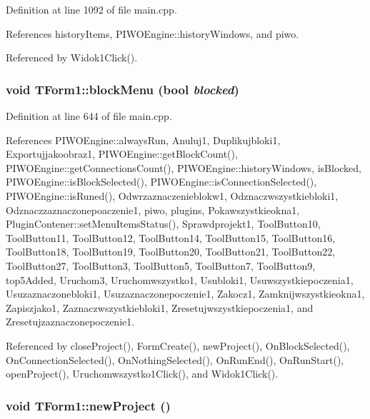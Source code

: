 Definition at line 1092 of file main.cpp.

References historyItems, PIWOEngine::historyWindows, and piwo.

Referenced by Widok1Click().\hypertarget{classTForm1_7e8d6ef0115bb7fcb6cb5f7c3bf23890}{
\subsubsection[blockMenu]{\setlength{\rightskip}{0pt plus 5cm}void TForm1::blockMenu (bool {\em blocked})}}
\label{classTForm1_7e8d6ef0115bb7fcb6cb5f7c3bf23890}




Definition at line 644 of file main.cpp.

References PIWOEngine::alwaysRun, Anuluj1, Duplikujbloki1, Exportujjakoobraz1, PIWOEngine::getBlockCount(), PIWOEngine::getConnectionsCount(), PIWOEngine::historyWindows, isBlocked, PIWOEngine::isBlockSelected(), PIWOEngine::isConnectionSelected(), PIWOEngine::isRuned(), Odwrzaznaczenieblokw1, Odznaczwszystkiebloki1, Odznaczzaznaczonepoaczenie1, piwo, plugins, Pokawszystkieokna1, PluginContener::setMenuItemsStatus(), Sprawdprojekt1, ToolButton10, ToolButton11, ToolButton12, ToolButton14, ToolButton15, ToolButton16, ToolButton18, ToolButton19, ToolButton20, ToolButton21, ToolButton22, ToolButton27, ToolButton3, ToolButton5, ToolButton7, ToolButton9, top5Added, Uruchom3, Uruchomwszystko1, Usubloki1, Usuwszystkiepoczenia1, Usuzaznaczonebloki1, Usuzaznaczonepoczenie1, Zakocz1, Zamknijwszystkieokna1, Zapiszjako1, Zaznaczwszystkiebloki1, Zresetujwszystkiepoczenia1, and Zresetujzaznaczonepoczenie1.

Referenced by closeProject(), FormCreate(), newProject(), OnBlockSelected(), OnConnectionSelected(), OnNothingSelected(), OnRunEnd(), OnRunStart(), openProject(), Uruchomwszystko1Click(), and Widok1Click().\hypertarget{classTForm1_e3e2982ce4ac87941997bca9b06ec934}{
\subsubsection[newProject]{\setlength{\rightskip}{0pt plus 5cm}void TForm1::newProject ()}}
\label{classTForm1_e3e2982ce4ac87941997bca9b06ec934}




